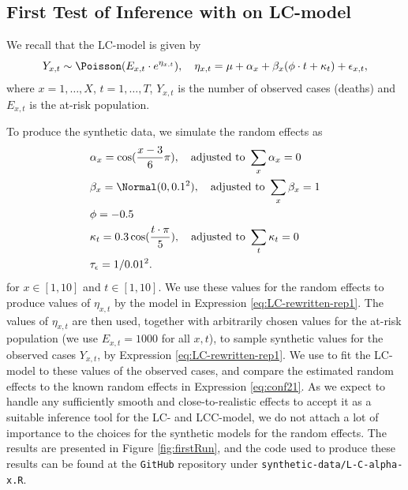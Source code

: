\subsection{First Test of Inference with \inlabru on LC-model}
\label{sec:synthFirstInferenceLC}
We recall that the LC-model is given by
\begin{equation}
    Y_{x,t} \sim \Poisson(E_{x,t}\cdot e^{\eta_{x,t}}), \quad \eta_{x,t} = \mu + \alpha_x + \beta_x(\phi \cdot t + \kappa_t) + \epsilon_{x,t},
    \label{eq:LC-rewritten-rep1}
\end{equation}
where $x = 1,\ldots,X$, $t = 1,\ldots,T$, $Y_{x,t}$ is the number of observed cases (deaths) and $E_{x,t}$ is the at-risk population.

\newpar To produce the synthetic data, we simulate the random effects as
\begin{equation}
    \begin{aligned}
    &\alpha_x = \cos(\frac{x-3}{6}\pi), \quad \text{adjusted to } \sum_x\alpha_x = 0\\
    &\beta_x = \Normal(0,0.1^2), \quad \text{adjusted to } \sum_x\beta_x = 1\\
    &\phi = -0.5\\
    &\kappa_t = 0.3\cos(\frac{t\cdot \pi}{5}), \quad \text{adjusted to } \sum_t\kappa_t = 0\\
    &\tau_{\epsilon} = 1/0.01^2.
    \end{aligned}
    \label{eq:conf21}
\end{equation}
for $x\in [1,10]$ and $t \in [1,10]$. We use these values for the random effects to produce values of $\eta_{x,t}$ by the model in Expression \ref{eq:LC-rewritten-rep1}. The values of $\eta_{x,t}$ are then used, together with arbitrarily chosen values for the at-risk population (we use $E_{x,t} = 1000$ for all $x,t$), to sample synthetic values for the observed cases $Y_{x,t}$, by Expression \ref{eq:LC-rewritten-rep1}. We use \inlabru to fit the LC-model to these values of the observed cases, and compare the estimated random effects to the known random effects in Expression \ref{eq:conf21}. As we expect \inlabru to handle any sufficiently smooth and close-to-realistic effects to accept it as a suitable inference tool for the LC- and LCC-model, we do not attach a lot of importance to the choices for the synthetic models for the random effects. The results are presented in Figure \ref{fig:firstRun}, and the code used to produce these results can be found at the \texttt{GitHub} repository under \texttt{synthetic-data/L-C-alpha-x.R}.


